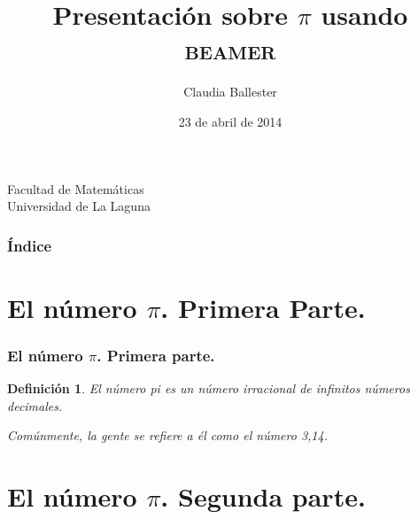 \documentclass{beamer}
\title[Presentación con Beamer]{Presentación sobre $\pi$ usando \textsc{beamer}}
\author[Claudia Ballester]{Claudia Ballester}
\date[23-04-2014]{23 de abril de 2014}
\newtheorem{definicion}{Definición}
\begin{document}
  
\begin{frame}


  \hspace*{7.0cm}
  
  \titlepage

  \begin{small}
    \begin{center}
     Facultad de Matemáticas \\
     Universidad de La Laguna
    \end{center}
  \end{small}

\end{frame}

\begin{frame}
  \frametitle{Índice}
  \tableofcontents[pausesections]
\end{frame}


\section{El número $\pi$. Primera Parte.}


\begin{frame}

\frametitle{El número $\pi$. Primera parte.}

\begin{definicion}
El número pi es un número irracional de infinitos números decimales.

Comúnmente, la gente se refiere a él como el número 3,14.

\end{definicion}

\end{frame}

\section{El número $\pi$. Segunda parte.}
\end{document}

